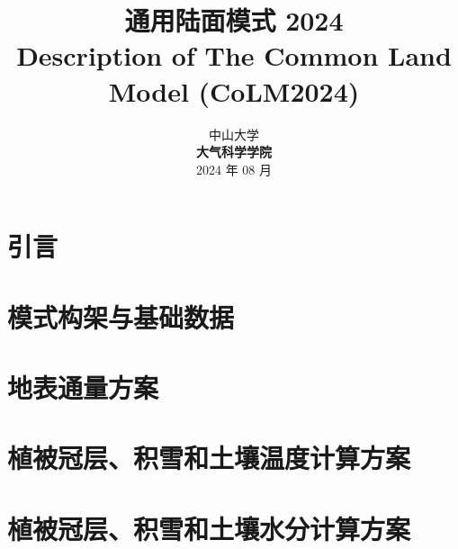 \documentclass[a4paper,12pt,twoside]{report}
\begin{document}
%

\title{\huge {\bf 通用陆面模式 2024}\\[3em]
\fontsize {22}{24}
\bf{ Description of The Common Land Model (CoLM2024)}\\[3in]
\fontsize {20}{23}%
}

\author{%
 \large{ 中山大学 }\\[0.1in]
 {\bf 大气科学学院}\\[1in]
 \upshape
 \large%
2024 年 08 月%
}

\maketitle
\preface
%
%
%
%

\body
\part{引言}


\part{模式构架与基础数据}



\part{地表通量方案}\label{part:flux}






\part{植被冠层、积雪和土壤温度计算方案}\label{part:temp}



\part{植被冠层、积雪和土壤水分计算方案}\label{part:SPC}



\end{document}
